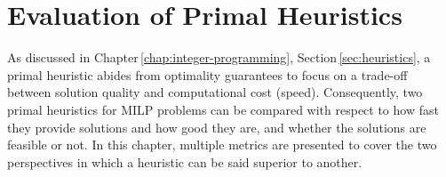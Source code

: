 

\chapter{Evaluation of Primal Heuristics}\label{chap:evaluation}

As discussed in Chapter\,\ref{chap:integer-programming}, Section\,\ref{sec:heuristics}, a primal heuristic abides from optimality guarantees to focus on a trade-off between solution quality and computational cost (speed).
Consequently, two primal heuristics for MILP problems can be compared with respect to how fast they provide solutions and how good they are, and whether the solutions are feasible or not.
In this chapter, multiple metrics are presented to cover the two perspectives in which a heuristic can be said superior to another.


\section*{}

